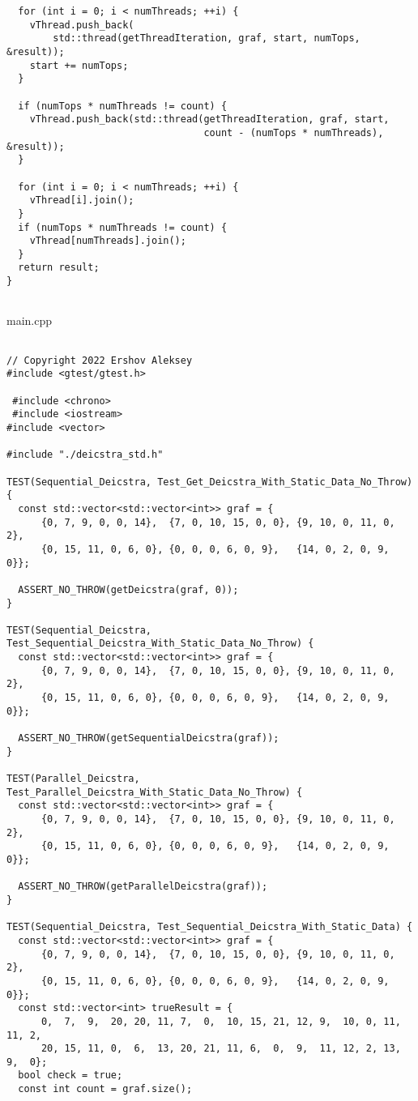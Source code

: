 \documentclass{report}
\begin{document}
\begin{lstlisting}
  for (int i = 0; i < numThreads; ++i) {
    vThread.push_back(
        std::thread(getThreadIteration, graf, start, numTops, &result));
    start += numTops;
  }

  if (numTops * numThreads != count) {
    vThread.push_back(std::thread(getThreadIteration, graf, start,
                                  count - (numTops * numThreads), &result));
  }

  for (int i = 0; i < numThreads; ++i) {
    vThread[i].join();
  }
  if (numTops * numThreads != count) {
    vThread[numThreads].join();
  }
  return result;
}


\end{lstlisting}
main.cpp
\begin{lstlisting}

// Copyright 2022 Ershov Aleksey
#include <gtest/gtest.h>

 #include <chrono>
 #include <iostream>
#include <vector>

#include "./deicstra_std.h"

TEST(Sequential_Deicstra, Test_Get_Deicstra_With_Static_Data_No_Throw) {
  const std::vector<std::vector<int>> graf = {
      {0, 7, 9, 0, 0, 14},  {7, 0, 10, 15, 0, 0}, {9, 10, 0, 11, 0, 2},
      {0, 15, 11, 0, 6, 0}, {0, 0, 0, 6, 0, 9},   {14, 0, 2, 0, 9, 0}};

  ASSERT_NO_THROW(getDeicstra(graf, 0));
}

TEST(Sequential_Deicstra, Test_Sequential_Deicstra_With_Static_Data_No_Throw) {
  const std::vector<std::vector<int>> graf = {
      {0, 7, 9, 0, 0, 14},  {7, 0, 10, 15, 0, 0}, {9, 10, 0, 11, 0, 2},
      {0, 15, 11, 0, 6, 0}, {0, 0, 0, 6, 0, 9},   {14, 0, 2, 0, 9, 0}};

  ASSERT_NO_THROW(getSequentialDeicstra(graf));
}

TEST(Parallel_Deicstra, Test_Parallel_Deicstra_With_Static_Data_No_Throw) {
  const std::vector<std::vector<int>> graf = {
      {0, 7, 9, 0, 0, 14},  {7, 0, 10, 15, 0, 0}, {9, 10, 0, 11, 0, 2},
      {0, 15, 11, 0, 6, 0}, {0, 0, 0, 6, 0, 9},   {14, 0, 2, 0, 9, 0}};

  ASSERT_NO_THROW(getParallelDeicstra(graf));
}

TEST(Sequential_Deicstra, Test_Sequential_Deicstra_With_Static_Data) {
  const std::vector<std::vector<int>> graf = {
      {0, 7, 9, 0, 0, 14},  {7, 0, 10, 15, 0, 0}, {9, 10, 0, 11, 0, 2},
      {0, 15, 11, 0, 6, 0}, {0, 0, 0, 6, 0, 9},   {14, 0, 2, 0, 9, 0}};
  const std::vector<int> trueResult = {
      0,  7,  9,  20, 20, 11, 7,  0,  10, 15, 21, 12, 9,  10, 0, 11, 11, 2,
      20, 15, 11, 0,  6,  13, 20, 21, 11, 6,  0,  9,  11, 12, 2, 13, 9,  0};
  bool check = true;
  const int count = graf.size();


\end{lstlisting}
\end{document}
